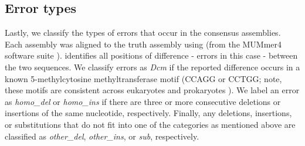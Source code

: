 \begin{table}
\centering
{}
\caption{Consensus BLAST identity summary statistics for the BCG test sample. Where consensus refers to 10kbp "chunks" of the genome assembly produced by the basecalled reads, for each model, mapped to the truth genome. Version indicates the \guppy{} version used for the basecalling before and after training. BLAST identity is the number of matching bases (in a chunk alignment) divided by the length of the alignment. Count refers to the number of consensus chunks assessed. Bold text highlights the best-performing model for the relevant metric. std=standard deviation.}
\label{tab:test-consensus-blast}
\end{table}

\subsection{Error types}
\label{sec:tubby-error-types}

Lastly, we classify the types of errors that occur in the consensus assemblies. Each  assembly was aligned to the truth assembly using  (from the MUMmer4 software suite \cite{mummer2018}).  identifies all positions of difference - errors in this case - between the two sequences. We classify errors as \emph{Dcm} if the reported difference occurs in a known 5-methylcytosine methyltransferase motif (CCAGG or CCTGG; note, these motifs are consistent across eukaryotes and prokaryotes \cite{Clark2013enchanced}). We label an error as \emph{homo\_del} or \emph{homo\_ins} if there are three or more consecutive deletions or insertions of the same nucleotide, respectively. Finally, any deletions, insertions, or substitutions that do not fit into one of the categories as mentioned above are classified as \emph{other\_del}, \emph{other\_ins}, or \emph{sub}, respectively.

